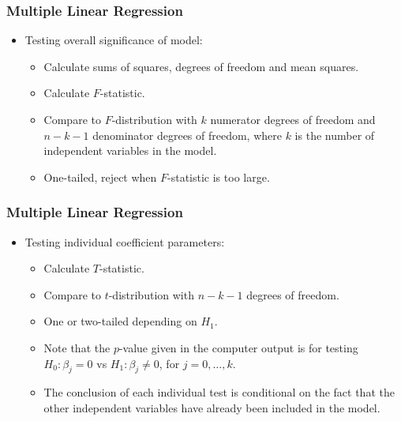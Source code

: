 \documentclass[12pt]{beamer}
\begin{document}
\begin{frame}
	\frametitle{Multiple Linear Regression}
	
	\begin{itemize}[label={\color{blue}$\blacktriangleright$}]
		\item Testing overall significance of model:
		\begin{itemize}[label={\color{blue}$\blacktriangleright$}]
			\item Calculate sums of squares, degrees of freedom and mean squares.
			\item Calculate $F$-statistic.
			\item Compare to $F$-distribution with $k$ numerator degrees of freedom and $n-k-1$ denominator degrees of freedom, where $k$ is the number of independent variables in the model.
			\item One-tailed, reject when $F$-statistic is too large.
		\end{itemize}
	\end{itemize}
	
\end{frame}
\begin{frame}
	\frametitle{Multiple Linear Regression}
	
	\begin{itemize}[label={\color{blue}$\blacktriangleright$}]
		\item Testing individual coefficient parameters:
		\begin{itemize}[label={\color{blue}$\blacktriangleright$}]
			\item Calculate $T$-statistic.
			\item Compare to $t$-distribution with $n-k-1$ degrees of freedom.
			\item One or two-tailed depending on $H_1$.
			\item Note that the $p$-value given in the computer output is for testing $H_0 : \beta_j = 0$ vs $H_1 : \beta_j \neq 0$, for $j = 0,\ldots,k$.
			\item The conclusion of each individual test is conditional on the fact that the other independent variables have already been included in the model.
		\end{itemize}
	\end{itemize}
	
\end{frame}
\end{document}
